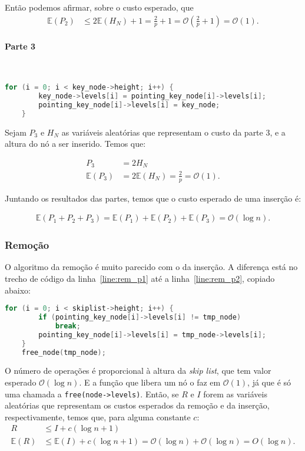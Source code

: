 \documentclass[paper=a4, fontsize=11pt]{scrartcl} %
\numberwithin{equation}{section}
\numberwithin{figure}{section}
\numberwithin{table}{section}
\numberwithin{definition}{section}
\numberwithin{theorem}{section}
\numberwithin{property}{section}
\numberwithin{proposition}{section}
\newcommand{\cO}{\ensuremath{\mathcal{O}}}
\renewcommand{\sl}{\textit{skip list}\xspace}
\newcommand{\Exp}{\ensuremath{{\mathbb{E}}}\xspace}
\begin{document}
Então podemos afirmar, sobre o custo esperado, que
\begin{align*}
\Exp(P_2) &\leq 2\Exp(H_N) + 1 = \frac{2}{p} + 1  = \cO \left( \frac{2}{p} + 1 \right) = \cO(1).
\end{align*}


\paragraph{Parte 3}
\ \\

\begin{lstlisting}[caption=Inserção Parte 3., language=C]
    for (i = 0; i < key_node->height; i++) {                     
        key_node->levels[i] = pointing_key_node[i]->levels[i];
        pointing_key_node[i]->levels[i] = key_node;
    }                                                           
\end{lstlisting}

Sejam $P_3$ e $H_N$ as variáveis aleatórias que representam o custo da parte 3, e a altura do nó a ser
inserido. Temos que:

\begin{align*}
P_3 &= 2 H_N \\
\Exp(P_3) &= 2 \Exp(H_N) = \frac{2}{p} = \cO(1).
\end{align*}


Juntando os resultados das partes, temos que o custo esperado de uma inserção é:

\begin{align*}
\Exp(P_1 + P_2 + P_3) = \Exp(P_1) + \Exp(P_2) + \Exp(P_3) = \cO(\log n).
\end{align*}


\subsubsection{Remoção}

O algoritmo da remoção é muito parecido com o da inserção. A diferença está no trecho de código da linha~\ref{line:rem_p1}
até a linha~\ref{line:rem_p2}, copiado abaixo:
\begin{lstlisting}[caption=Parte exclusiva da Remoção, language=C]
    for (i = 0; i < skiplist->height; i++) {
        if (pointing_key_node[i]->levels[i] != tmp_node)
            break;
        pointing_key_node[i]->levels[i] = tmp_node->levels[i];
    }
    free_node(tmp_node);
\end{lstlisting}

O número de operações é proporcional à altura da \sl, que tem valor esperado $\cO(\log n)$. E a função 
que libera um nó o faz em $\cO(1)$, já que é só uma chamada a \verb|free(node->levels)|. Então, se $R$ e $I$ forem
as variáveis aleatórias que representam os custos esperados da remoção e da inserção, respectivamente, temos que,
para alguma constante $c$:
\begin{align*}
R &\leq I + c( \log n + 1) \\
\Exp(R) &\leq \Exp(I) + c( \log n + 1) = \cO(\log n) + \cO(\log n) = O(\log n).
\end{align*}
\end{document}
